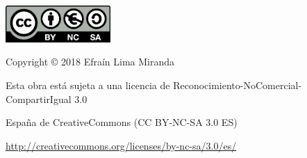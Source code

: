 \includegraphics[width=0.3\textwidth]{figs/previos/copyright.png}

Copyright © 2018 Efraín Lima Miranda

Esta obra está sujeta a una licencia de Reconocimiento-NoComercial-CompartirIgual 3.0

España de CreativeCommons (CC BY-NC-SA 3.0 ES) 

\url{http://creativecommons.org/licenses/by-nc-sa/3.0/es/}

\newpage